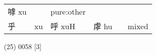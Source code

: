 \documentclass[14pt,a4paper]{scrartcl}
\begin{document}
\begin{longtable}[c]{@{}llllll@{}}
\begin{minipage}[t]{0.14\columnwidth}
嘑 xu
\strut\end{minipage} &
\begin{minipage}[t]{0.14\columnwidth}\raggedright\strut
\strut\end{minipage} &
\begin{minipage}[t]{0.14\columnwidth}\raggedright\strut
pure:other
\strut\end{minipage}\tabularnewline
\begin{minipage}[t]{0.14\columnwidth}\raggedright\strut
乎
\strut\end{minipage} &
\begin{minipage}[t]{0.14\columnwidth}\raggedright\strut
xu
\strut\end{minipage} &
\begin{minipage}[t]{0.14\columnwidth}\raggedright\strut
呼 xuH
\strut\end{minipage} &
\begin{minipage}[t]{0.14\columnwidth}\raggedright\strut
虖 hu
\strut\end{minipage} &
\begin{minipage}[t]{0.14\columnwidth}\raggedright\strut
\strut\end{minipage} &
\begin{minipage}[t]{0.14\columnwidth}\raggedright\strut
mixed
\strut\end{minipage}\tabularnewline
\bottomrule
\end{longtable}

(25) 0058 {[}3{]}
\end{document}
